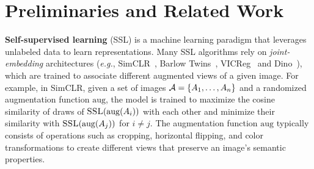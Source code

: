 \section{Preliminaries and Related Work}
\label{sec:related}

\textbf{Self-supervised learning} (SSL) is a machine learning paradigm that leverages unlabeled data to learn representations. Many SSL algorithms rely on \emph{joint-embedding} architectures (\emph{e.g.}, SimCLR~\citep{chen2020simclr}, Barlow Twins~\citep{zbontar2021barlow}, VICReg~\citep{vicreg} and Dino~\citep{Dino}), which are trained to associate different augmented views of a given image. For example, in SimCLR, given a set of images $\mathcal{A} = \{A_1,\ldots,A_n\}$ and a randomized augmentation function $\mathrm{aug}$, the model is trained to maximize the cosine similarity of draws of $\textsc{SSL}(\mathrm{aug}(A_i))$ with each other and minimize their similarity with $\textsc{SSL}(\mathrm{aug}(A_j))$ for $i \neq j$. The augmentation function $\mathrm{aug}$ typically consists of operations such as cropping, horizontal flipping, and color transformations to create different views that preserve an image's semantic properties. 

